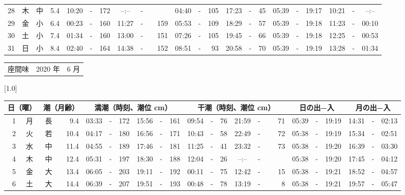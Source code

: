 \documentclass[12pt,a4j]{jsarticle}
\begin{document}
\begin{table}[htbp]
\begin{center}
{\begin{tabular}{|rc|cr|ccrccr|ccrccr|ccc|ccc|}
28 & 木 & 中 &  5.4 &  10:20 &-& 172 &  --:-- &-&~~~~~ &  04:40 &-& 105 &  17:23 &-&  45 & 05:39 & -& 19:17 & 10:21 & -& --:-- \\
29 & 金 & 小 &  6.4 &  00:23 &-& 160 &  11:27 &-& 159 &  05:53 &-& 109 &  18:29 &-&  57 & 05:39 & -& 19:18 & 11:23 & -& 00:10 \\
30 & 土 & 小 &  7.4 &  01:34 &-& 160 &  13:00 &-& 151 &  07:26 &-& 105 &  19:45 &-&  66 & 05:39 & -& 19:18 & 12:25 & -& 00:53 \\
31 & 日 & 小 &  8.4 &  02:40 &-& 164 &  14:38 &-& 152 &  08:51 &-&  93 &  20:58 &-&  70 & 05:39 & -& 19:19 & 13:28 & -& 01:34 \\
   \hline
   \end{tabular}}
   \end{center}
\end{table}
\newpage
 \begin{table}[htbp]
 \begin{center}
 \begin{tabular}{lcc}
 \LARGE{座間味}  & \large{2020 年} & \large{ 6 月} \\
 \end{tabular}
 \end{center}
 \begin{center}
    \scalebox{0.7}[1.0]{
    \begin{tabular}{|rc|cr|ccrccr|ccrccr|ccc|ccc|}
    \hline
    \multicolumn{2}{|c|}{日（曜）} & \multicolumn{2}{c|}{潮（月齢）} & \multicolumn{6}{c|}{満潮（時刻、潮位 cm）} & \multicolumn{6}{c|}{干潮（時刻、潮位 cm）} & \multicolumn{3}{c|}{日の出−入} &  \multicolumn{3}{c|}{月の出−入}\\
 \hline
 1 & 月 & 長 &  9.4 &  03:33 &-& 172 &  15:56 &-& 161 &  09:54 &-&  76 &  21:59 &-&  71 & 05:39 & -& 19:19 & 14:31 & -& 02:13 \\
 2 & 火 & 若 & 10.4 &  04:17 &-& 180 &  16:56 &-& 171 &  10:43 &-&  58 &  22:49 &-&  72 & 05:38 & -& 19:19 & 15:34 & -& 02:51 \\
 3 & 水 & 中 & 11.4 &  04:55 &-& 189 &  17:46 &-& 181 &  11:25 &-&  41 &  23:32 &-&  73 & 05:38 & -& 19:20 & 16:39 & -& 03:30 \\
 4 & 木 & 中 & 12.4 &  05:31 &-& 197 &  18:30 &-& 188 &  12:04 &-&  26 &  --:-- &-&~~~~~ & 05:38 & -& 19:20 & 17:45 & -& 04:12 \\
 5 & 金 & 大 & 13.4 &  06:05 &-& 203 &  19:11 &-& 192 &  00:11 &-&  75 &  12:42 &-&  15 & 05:38 & -& 19:21 & 18:52 & -& 04:57 \\
 6 & 土 & 大 & 14.4 &  06:39 &-& 207 &  19:51 &-& 193 &  00:48 &-&  78 &  13:19 &-&   8 & 05:38 & -& 19:21 & 19:57 & -& 05:47 \\

\end{tabular}}
\end{center}
\end{table}
\end{document}
